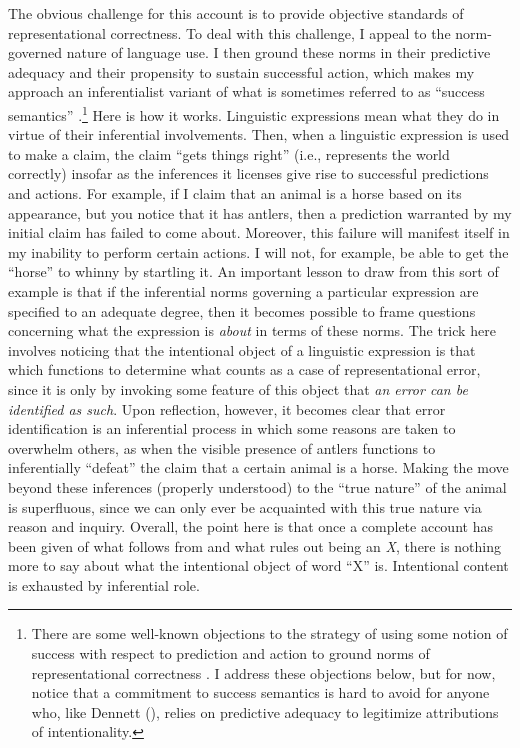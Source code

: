 The obvious challenge for this account is to provide objective standards of representational correctness. To deal with this challenge, I appeal to the norm-governed nature of language use. I then ground these norms in their predictive adequacy and their propensity to sustain successful action, which makes my approach an inferentialist variant of what is sometimes referred to as ``success semantics'' \citep{Whyte:1990,Blackburn:2005}.\footnote{There are some well-known objections to the strategy of using some notion of success with respect to prediction and action to ground norms of representational correctness \citep{Brandom:1994b,Brandom:2011,Blackburn:2005}. I address these objections below, but for now, notice that a commitment to success semantics is hard to avoid for anyone who, like Dennett (\citeyear{Dennett:1987,Dennett:1991}), relies on predictive adequacy to legitimize attributions of intentionality.} Here is how it works. Linguistic expressions mean what they do in virtue of their inferential involvements. Then, when a linguistic expression is used to make a claim, the claim ``gets things right'' (i.e., represents the world correctly) insofar as the inferences it licenses give rise to successful predictions and actions. For example, if I claim that an animal is a horse based on its appearance, but you notice that it has antlers, then a prediction warranted by my initial claim has failed to come about. Moreover, this failure will manifest itself in my inability to perform certain actions. I will not, for example, be able to get the ``horse'' to whinny by startling it. An important lesson to draw from this sort of example is that if the inferential norms governing a particular expression are specified to an adequate degree, then it becomes possible to frame questions concerning what the expression is \textit{about} in terms of these norms. The trick here involves noticing that the intentional object of a linguistic expression is that which functions to determine what counts as a case of representational error, since it is only by invoking some feature of this object that \textit{an error can be identified as such}. Upon reflection, however, it becomes clear that error identification is an inferential process in which some reasons are taken to overwhelm others, as when the visible presence of antlers functions to inferentially ``defeat'' the claim that a certain animal is a horse. Making the move beyond these inferences (properly understood) to the ``true nature'' of the animal is superfluous, since we can only ever be acquainted with this true nature via reason and inquiry. Overall, the point here is that once a complete account has been given of what follows from and what rules out being an \textit{X}, there is nothing more to say about what the intentional object of word ``X'' is. Intentional content is exhausted by inferential role. 

